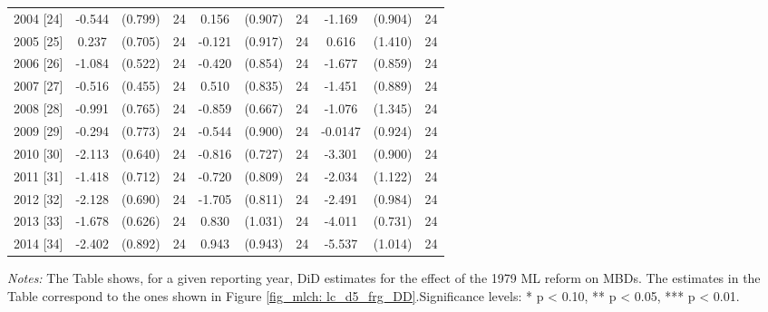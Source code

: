 \begin{table}[H]
\begin{threeparttable}
{\begin{tabular}{l*{9}{c}}
				2004 [24]	&      -0.544         &     (0.799) &	24	&       0.156         &     (0.907)	& 24	&      -1.169         &     (0.904)	& 24	\\
				2005 [25]	&       0.237         &     (0.705) &	24	&      -0.121         &     (0.917)	& 24	&       0.616         &     (1.410)	& 24	\\
				2006 [26]	&      -1.084\sym{**} &     (0.522) &	24	&      -0.420         &     (0.854)	& 24	&      -1.677\sym{*}  &     (0.859)	& 24	\\
				2007 [27]	&      -0.516         &     (0.455) &	24	&       0.510         &     (0.835)	& 24	&      -1.451         &     (0.889)	& 24	\\
				2008 [28]	&      -0.991         &     (0.765) &	24	&      -0.859         &     (0.667)	& 24	&      -1.076         &     (1.345)	& 24	\\
				2009 [29]	&      -0.294         &     (0.773) &	24	&      -0.544         &     (0.900)	& 24	&     -0.0147         &     (0.924)	& 24	\\
				2010 [30]	&      -2.113\sym{***}&     (0.640) &	24	&      -0.816         &     (0.727)	& 24	&      -3.301\sym{***}&     (0.900)	& 24	\\
				2011 [31]	&      -1.418\sym{*}  &     (0.712) &	24	&      -0.720         &     (0.809)	& 24	&      -2.034\sym{*}  &     (1.122)	& 24	\\
				2012 [32]	&      -2.128\sym{***}&     (0.690) &	24	&      -1.705\sym{**} &     (0.811)	& 24	&      -2.491\sym{**} &     (0.984)	& 24	\\
				2013 [33]	&      -1.678\sym{**} &     (0.626) &	24	&       0.830         &     (1.031)	& 24	&      -4.011\sym{***}&     (0.731)	& 24	\\
				2014 [34]	&      -2.402\sym{**} &     (0.892) &	24	&       0.943         &     (0.943)	& 24	&      -5.537\sym{***}&     (1.014)	& 24	\\
				\bottomrule 
		\end{tabular}}
		\begin{tablenotes} 
			\item \scriptsize \emph{Notes:} The Table shows, for a given reporting year, DiD estimates for the effect of the 1979 ML reform on MBDs. The estimates in the Table correspond to the ones shown in Figure \ref{fig_mlch: lc_d5_frg_DD}.\newline Significance levels: * p < 0.10, ** p < 0.05, *** p < 0.01.
		\end{tablenotes} 
	\end{threeparttable} 
\end{table}